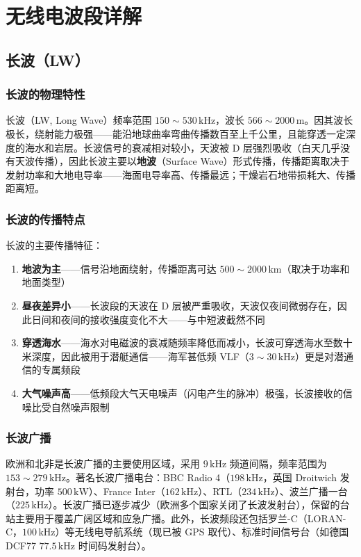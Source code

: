 \documentclass[12pt,UTF8]{ctexbook}
\begin{document}
\chapter{无线电波段详解}
\label{chap:radio_bands_detail}

\section{长波（LW）}
\label{sec:long_wave}

\subsection{长波的物理特性}

长波（LW, Long Wave）频率范围 $150\sim530\,\mathrm{kHz}$，波长 $566\sim2000\,\mathrm{m}$。因其波长极长，绕射能力极强——能沿地球曲率弯曲传播数百至上千公里，且能穿透一定深度的海水和岩层。长波信号的衰减相对较小，天波被 D 层强烈吸收（白天几乎没有天波传播），因此长波主要以\textbf{地波}（Surface Wave）形式传播，传播距离取决于发射功率和大地电导率——海面电导率高、传播最远；干燥岩石地带损耗大、传播距离短。

\subsection{长波的传播特点}

长波的主要传播特征：
\begin{enumerate}
\item \textbf{地波为主}——信号沿地面绕射，传播距离可达 $500\sim2000\,\mathrm{km}$（取决于功率和地面类型）
\item \textbf{昼夜差异小}——长波段的天波在 D 层被严重吸收，天波仅夜间微弱存在，因此日间和夜间的接收强度变化不大——与中短波截然不同
\item \textbf{穿透海水}——海水对电磁波的衰减随频率降低而减小，长波可穿透海水至数十米深度，因此被用于潜艇通信——海军甚低频 VLF（$3\sim30\,\mathrm{kHz}$）更是对潜通信的专属频段
\item \textbf{大气噪声高}——低频段大气天电噪声（闪电产生的脉冲）极强，长波接收的信噪比受自然噪声限制
\end{enumerate}

\subsection{长波广播}

欧洲和北非是长波广播的主要使用区域，采用 $9\,\mathrm{kHz}$ 频道间隔，频率范围为 $153\sim279\,\mathrm{kHz}$。著名长波广播电台：BBC Radio 4（$198\,\mathrm{kHz}$，英国 Droitwich 发射台，功率 $500\,\mathrm{kW}$）、France Inter（$162\,\mathrm{kHz}$）、RTL（$234\,\mathrm{kHz}$）、波兰广播一台（$225\,\mathrm{kHz}$）。长波广播已逐步减少（欧洲多个国家关闭了长波发射台），保留的台站主要用于覆盖广阔区域和应急广播。此外，长波频段还包括罗兰-C（LORAN-C，$100\,\mathrm{kHz}$）等无线电导航系统（现已被 GPS 取代）、标准时间信号台（如德国 DCF77 $77.5\,\mathrm{kHz}$ 时间码发射台）。
\end{document}
